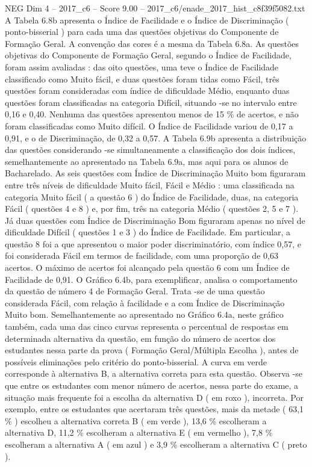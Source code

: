 \begin{textsample}{NEG Dim 4 – 2017\_c6 – Score 9.00 – 2017\_c6/enade\_2017\_hist\_c8f39f5082.txt}
A Tabela 6.8b apresenta o Índice de Facilidade e o Índice de Discriminação ( ponto-bisserial ) para cada uma das questões objetivas do Componente de Formação Geral.
A convenção das cores é a mesma da Tabela 6.8a.
As questões objetivas do Componente de Formação Geral, segundo o Índice de Facilidade, foram assim avaliadas : das oito questões, uma teve o Índice de Facilidade classificado como Muito fácil, e duas questões foram tidas como Fácil, três questões foram consideradas com índice de dificuldade Médio, enquanto duas questões foram classificadas na categoria Difícil, situando -se no intervalo entre 0,16 e 0,40.
Nenhuma das questões apresentou menos de 15 \% de acertos, e não foram classificadas como Muito difícil.
O Índice de Facilidade variou de 0,17 a 0,91, e o de Discriminação, de 0,32 a 0,57.
A Tabela 6.9b apresenta a distribuição das questões considerando -se simultaneamente a classificação dos dois índices, semelhantemente ao apresentado na Tabela 6.9a, mas aqui para os alunos de Bacharelado.
As seis questões com Índice de Discriminação Muito bom figuraram entre três níveis de dificuldade Muito fácil, Fácil e Médio : uma classificada na categoria Muito fácil ( a questão 6 ) do Índice de Facilidade, duas, na categoria Fácil ( questões 4 e 8 ) e, por fim, três na categoria Médio ( questões 2, 5 e 7 ).
Já duas questões com Índice de Discriminação Bom figuraram apenas no nível de dificuldade Difícil ( questões 1 e 3 ) do Índice de Facilidade.
Em particular, a questão 8 foi a que apresentou o maior poder discriminatório, com índice 0,57, e foi considerada Fácil em termos de facilidade, com uma proporção de 0,63 acertos.
O máximo de acertos foi alcançado pela questão 6 com um Índice de Facilidade de 0,91.
O Gráfico 6.4b, para exemplificar, analisa o comportamento da questão de número 4 de Formação Geral.
Trata -se de uma questão considerada Fácil, com relação à facilidade e a com Índice de Discriminação Muito bom.
Semelhantemente ao apresentado no Gráfico 6.4a, neste gráfico também, cada uma das cinco curvas representa o percentual de respostas em determinada alternativa da questão, em função do número de acertos dos estudantes nessa parte da prova ( Formação Geral/Múltipla Escolha ), antes de possíveis eliminações pelo critério do ponto-bisserial.
A curva em verde corresponde à alternativa B, a alternativa correta para esta questão.
Observa -se que entre os estudantes com menor número de acertos, nessa parte do exame, a situação mais frequente foi a escolha da alternativa D ( em roxo ), incorreta.
Por exemplo, entre os estudantes que acertaram três questões, mais da metade ( 63,1 \% ) escolheu a alternativa correta B ( em verde ), 13,6 \% escolheram a alternativa D, 11,2 \% escolheram a alternativa E ( em vermelho ), 7,8 \% escolheram a alternativa A ( em azul ) e 3,9 \% escolheram a alternativa C ( preto ).

\end{textsample}
